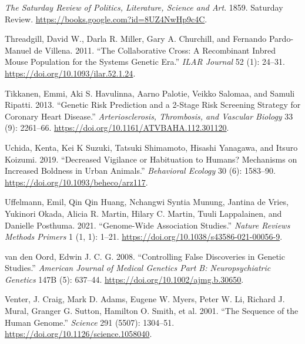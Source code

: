 \documentclass[
]{book}
\newlength{\cslhangindent}
\newlength{\cslentryspacingunit} %
\newenvironment{CSLReferences}[2] %
 {%
  \setlength{\parindent}{0pt}
  \ifodd #1
  \let\oldpar\par
  \def\par{\hangindent=\cslhangindent\oldpar}
  \fi
  \setlength{\parskip}{#2\cslentryspacingunit}
 }%
 {}
\begin{document}
\begin{CSLReferences}{1}{0}
\leavevmode{}%
\emph{The {Saturday Review} of {Politics}, {Literature}, {Science} and {Art}}. 1859. {Saturday Review}. \url{https://books.google.com?id=8UZ4NwHp9c4C}.

\leavevmode{}%
Threadgill, David W., Darla R. Miller, Gary A. Churchill, and Fernando Pardo-Manuel de Villena. 2011. {``The {Collaborative Cross}: {A Recombinant Inbred Mouse Population} for the {Systems Genetic Era}.''} \emph{ILAR Journal} 52 (1): 24--31. \url{https://doi.org/10.1093/ilar.52.1.24}.

\leavevmode{}%
Tikkanen, Emmi, Aki S. Havulinna, Aarno Palotie, Veikko Salomaa, and Samuli Ripatti. 2013. {``Genetic {Risk Prediction} and a 2-{Stage Risk Screening Strategy} for {Coronary Heart Disease}.''} \emph{Arteriosclerosis, Thrombosis, and Vascular Biology} 33 (9): 2261--66. \url{https://doi.org/10.1161/ATVBAHA.112.301120}.

\leavevmode{}%
Uchida, Kenta, Kei K Suzuki, Tatsuki Shimamoto, Hisashi Yanagawa, and Itsuro Koizumi. 2019. {``Decreased Vigilance or Habituation to Humans? {Mechanisms} on Increased Boldness in Urban Animals.''} \emph{Behavioral Ecology} 30 (6): 1583--90. \url{https://doi.org/10.1093/beheco/arz117}.

\leavevmode{}%
Uffelmann, Emil, Qin Qin Huang, Nchangwi Syntia Munung, Jantina de Vries, Yukinori Okada, Alicia R. Martin, Hilary C. Martin, Tuuli Lappalainen, and Danielle Posthuma. 2021. {``Genome-Wide Association Studies.''} \emph{Nature Reviews Methods Primers} 1 (1, 1): 1--21. \url{https://doi.org/10.1038/s43586-021-00056-9}.

\leavevmode{}%
van den Oord, Edwin J. C. G. 2008. {``Controlling False Discoveries in Genetic Studies.''} \emph{American Journal of Medical Genetics Part B: Neuropsychiatric Genetics} 147B (5): 637--44. \url{https://doi.org/10.1002/ajmg.b.30650}.

\leavevmode{}%
Venter, J. Craig, Mark D. Adams, Eugene W. Myers, Peter W. Li, Richard J. Mural, Granger G. Sutton, Hamilton O. Smith, et al. 2001. {``The {Sequence} of the {Human Genome}.''} \emph{Science} 291 (5507): 1304--51. \url{https://doi.org/10.1126/science.1058040}.


\end{CSLReferences}
\end{document}
